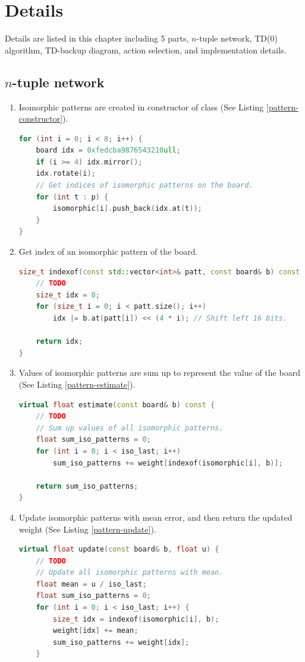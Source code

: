 \chapter{Details}
\indent
    Details are listed in this chapter including 5 parts, 
    $n$-tuple network, TD(0) algorithm, TD-backup diagram, action selection, and implementation details.

\section{$n$-tuple network} 
\begin{enumerate}
	\item Isomorphic patterns are created in constructor of class  (See Listing \ref{pattern-constructor}). 
\begin{lstlisting}[language=C++, caption={C++ code of class \textcolor{blue}{pattern} constructor.}, label={pattern-constructor}]
for (int i = 0; i < 8; i++) {
	board idx = 0xfedcba9876543210ull;
	if (i >= 4) idx.mirror();
	idx.rotate(i);
	// Get indices of isomorphic patterns on the board.
	for (int t : p) {
		isomorphic[i].push_back(idx.at(t));
	}
}\end{lstlisting}
	\item Get index of an isomorphic pattern of the board. 
\begin{lstlisting}[language=C++, caption={C++ code of \textcolor{blue}{indexof} function of class \textcolor{blue}{pattern}.}, label={pattern-indexof}]
size_t indexof(const std::vector<int>& patt, const board& b) const {
	// TODO
	size_t idx = 0;
	for (size_t i = 0; i < patt.size(); i++)
		idx |= b.at(patt[i]) << (4 * i); // Shift left 16 bits.

	return idx;
}\end{lstlisting}
	\item Values of isomorphic patterns are sum up to represent the value of the board (See Listing \ref{pattern-estimate}). 
\begin{lstlisting}[language=C++, caption={C++ code of \textcolor{blue}{estimate} function of class \textcolor{blue}{pattern}.}, label={pattern-estimate}]
virtual float estimate(const board& b) const {
	// TODO
	// Sum up values of all isomorphic patterns.
	float sum_iso_patterns = 0;
	for (int i = 0; i < iso_last; i++) 
		sum_iso_patterns += weight[indexof(isomorphic[i], b)];

	return sum_iso_patterns;
}\end{lstlisting}
	\item Update isomorphic patterns with mean error, and then return the updated weight (See Listing \ref{pattern-update}). 
\begin{lstlisting}[language=C++, caption={C++ code of \textcolor{blue}{update} function of class \textcolor{blue}{pattern}.}, label={pattern-update}]
virtual float update(const board& b, float u) {
	// TODO
	// Update all isomorphic patterns with mean.
	float mean = u / iso_last;
	float sum_iso_patterns = 0;
	for (int i = 0; i < iso_last; i++) {
		size_t idx = indexof(isomorphic[i], b);
		weight[idx] += mean;
		sum_iso_patterns += weight[idx];
	}


\end{lstlisting}
\end{enumerate}
